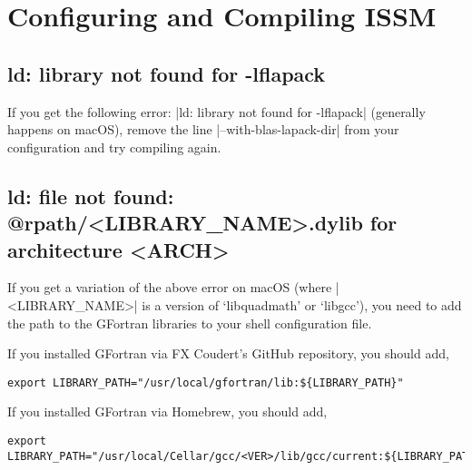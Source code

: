 
\section{Configuring and Compiling ISSM} \label{sec:troubleshooting-compiling-issm}
\subsection*{ld: library not found for -lflapack}
If you get the following error: \lstinlinebg|ld: library not found for -lflapack| (generally happens on macOS), remove the line \lstinlinebg|--with-blas-lapack-dir| from your configuration and try compiling again.

\subsection*{ld: file not found: @rpath/<LIBRARY\_NAME>.dylib for architecture <ARCH>}
If you get a variation of the above error on macOS (where \lstinlinebg|<LIBRARY_NAME>| is a version of `libquadmath' or `libgcc'), you need to add the path to the GFortran libraries to your shell configuration file.

If you installed GFortran via FX Coudert's GitHub repository, you should add,
\begin{lstlisting}
export LIBRARY_PATH="/usr/local/gfortran/lib:${LIBRARY_PATH}"
\end{lstlisting}

If you installed GFortran via Homebrew, you should add,
\begin{lstlisting}
export LIBRARY_PATH="/usr/local/Cellar/gcc/<VER>/lib/gcc/current:${LIBRARY_PATH}"
\end{lstlisting}

\clearpage %
